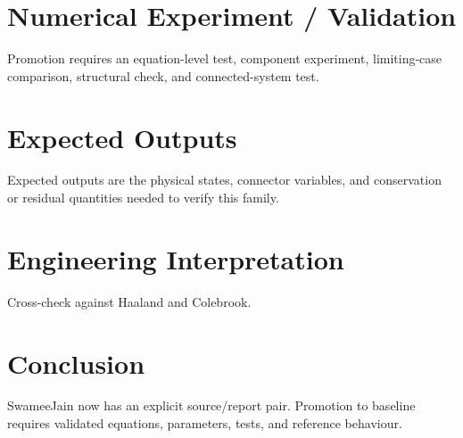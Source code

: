 \documentclass[10pt,a4paper]{article}
\begin{document}
\section{Numerical Experiment / Validation}Promotion requires an equation-level test, component experiment, limiting-case comparison, structural check, and connected-system test.
\section{Expected Outputs}Expected outputs are the physical states, connector variables, and conservation or residual quantities needed to verify this family.
\section{Engineering Interpretation}Cross-check against Haaland and Colebrook.
\section*{Conclusion}SwameeJain now has an explicit source/report pair. Promotion to baseline requires validated equations, parameters, tests, and reference behaviour.
\end{document}
